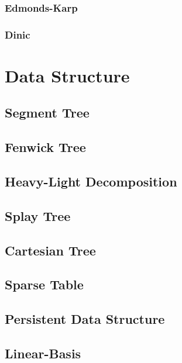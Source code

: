 \documentclass[a4paper]{article}
\begin{document}
\subsubsection{Edmonds-Karp}



\subsubsection{Dinic}



\pagebreak

\section{Data Structure}

\subsection{Segment Tree}

\subsection{Fenwick Tree}

\subsection{Heavy-Light Decomposition}

\subsection{Splay Tree}

\subsection{Cartesian Tree}

\subsection{Sparse Table}

\subsection{Persistent Data Structure}

\subsection{Linear-Basis}
\end{document}
